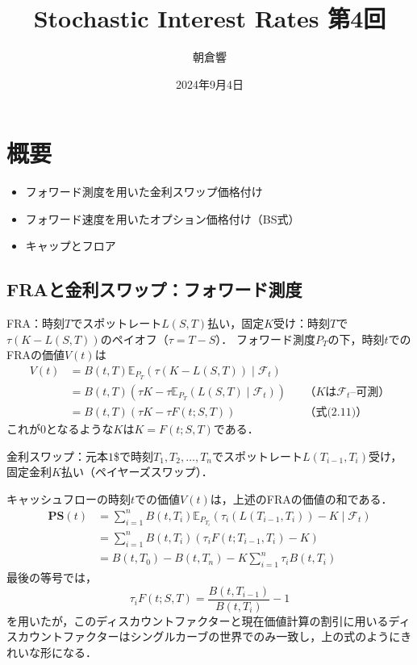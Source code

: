 \documentclass[a4paper, lualatex, ja=standard]{bxjsarticle}
\title{Stochastic Interest Rates 第4回}
\author{朝倉響}
\date{2024年9月4日}
\theoremstyle{theorem}
\theoremstyle{definition}
\newcommand{\F}{\mathcal{F}}
\newcommand{\E}{\mathbb{E}}
\begin{document}
\maketitle

\section*{概要}
\begin{itemize}
  \item フォワード測度を用いた金利スワップ価格付け
  \item フォワード速度を用いたオプション価格付け（BS式）
  \item キャップとフロア
\end{itemize}

\setcounter{section}{2}
\setcounter{subsection}{4}
\setcounter{equation}{11}
\subsection{FRAと金利スワップ：フォワード測度}
FRA：時刻$T$でスポットレート$L(S,T)$払い，固定$K$受け：時刻$T$で$\tau(K-L(S,T))$のペイオフ（$\tau=T-S$）．
フォワード測度$P_T$の下，時刻$t$でのFRAの価値$V(t)$は
\begin{align*}
  V(t) &= B(t,T)\E_{P_T}(\tau(K-L(S,T))\mid\F_t) &&\\
  &= B(t,T)(\tau K - \tau\E_{P_T}(L(S,T)\mid\F_t)) &&\text{（$K$は$\F_t$--可測）} \\
  &= B(t,T)(\tau K - \tau F(t;S,T)) && \text{（式(2.11)）}
\end{align*}
これが$0$となるような$K$は$K=F(t;S,T)$である．

金利スワップ：元本$1$\$で時刻$T_1,T_2,\ldots,T_n$でスポットレート$L(T_{i-1},T_i)$受け，固定金利$K$払い（ペイヤーズスワップ）．

キャッシュフローの時刻$t$での価値$V(t)$は，上述のFRAの価値の和である．
\begin{align*}
  \mathbf{PS}(t) &= \sum_{i=1}^n B(t,T_i)\E_{P_{T_i}}(\tau_i(L(T_{i-1},T_i))-K\mid\F_t) \\
  &= \sum_{i=1}^n B(t,T_i)(\tau_i F(t;T_{i-1},T_i)-K) \\
  &= B(t,T_0) - B(t,T_n) -K\sum_{i=1}^n \tau_iB(t,T_i)
\end{align*}
最後の等号では，
\begin{equation*}
  \tau_i F(t;S,T) = \frac{B(t,T_{i-1})}{B(t,T_i)} - 1
\end{equation*}
を用いたが，このディスカウントファクターと現在価値計算の割引に用いるディスカウントファクターはシングルカーブの世界でのみ一致し，上の式のようにきれいな形になる．
\end{document}
